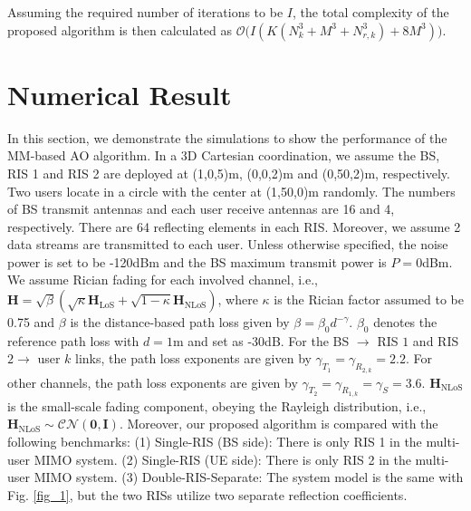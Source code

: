 \documentclass[journal]{IEEEtran}
\begin{document}
{%
Assuming the required number of iterations to be $I$, 
the total  complexity of the proposed algorithm is then calculated  as $\mathcal {O} \big (I ({K}( {N}_{k}^{3} +{M}^{3}+ N_{r,k}^{3}) +{8}{M}^{3}) \big)$.
\vspace{-3mm}
    \section{Numerical Result}
    \vspace{-1mm}
In this section, we demonstrate the simulations to show the performance of the MM-based AO algorithm. In a 3D Cartesian coordination, we assume the BS, RIS 1 and RIS 2 are deployed at (1,0,5)m, (0,0,2)m and (0,50,2)m, respectively. Two users   locate in a circle with the center at (1,50,0)m randomly. The numbers of BS transmit antennas  and each user receive antennas are 16 and 4, respectively. There are 64 reflecting elements in each RIS. Moreover, we assume 2 data streams are transmitted to each user. Unless otherwise specified, the noise power is set to be -120dBm and the BS maximum transmit power is ${P}=0$dBm. We assume Rician fading for each involved channel, i.e., $ {\mathbf{H}} = \sqrt { \beta } (\sqrt {\kappa } {\mathbf{H}}_{\mathrm{ LoS}} + \sqrt {1 - \kappa } {\mathbf{H}}_{\mathrm{ NLoS}}) $, where $\kappa $ is the Rician factor assumed to be 0.75 and $\beta$ is the distance-based path loss given by $\beta = \beta _{0} d^{-\gamma }$. $\beta _{0}$ denotes the reference path loss with ${d}=1$m and set as -30dB. For the BS $\rightarrow$ RIS ${1}$ and  RIS ${2\rightarrow}$ user ${k}$ links, the path loss exponents are given by ${\gamma }_{{T}_{1}}={\gamma }_{{R}_{2,k}}=2.2$. For other channels, the path loss exponents are given by ${\gamma }_{{T}_{2}}={\gamma }_{{R}_{1,k}}={\gamma }_{S}=3.6$.  ${\mathbf{H}}_{\mathrm{ NLoS}}$ is the small-scale fading component, obeying the Rayleigh distribution, i.e., ${\mathbf{H}}_{\mathrm{ NLoS}}\sim \mathcal {CN}(\mathbf{0},\mathbf{I})$. Moreover, our proposed algorithm is compared with the following benchmarks: (1) Single-RIS (BS side): There is only RIS 1 in the multi-user MIMO system. (2) Single-RIS (UE side): There is only RIS 2 in the multi-user MIMO system. (3) Double-RIS-Separate: The system model is the same with Fig. \ref{fig_1}, but the two RISs utilize two separate reflection coefficients.

}
\end{document}
